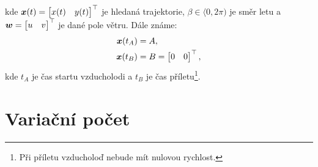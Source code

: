 \documentclass[reqno, a4paper]{amsart}
\numberwithin{equation}{section}
\begin{document}
kde $
\bm{x}(t)=
  \begin{bmatrix}
    x(t) &
    y(t)
  \end{bmatrix}
^\top
$ je hledaná trajektorie, $\beta \in \langle 0, 2 \pi)$ je směr letu a $
\vec{w}
=
\transpose{
  \begin{bmatrix}
    u &
    v
  \end{bmatrix}
}
$ je dané pole větru. Dále známe:
\begin{subequations}
  \label{eq:1}
  \begin{align}
    \label{eq:2}
    \bm{x}(t_{A})& = A, \\
    \label{eq:3}
    \bm{x}(t_{B})& = B = 
  \begin{bmatrix}
    0 &
    0
  \end{bmatrix}
^\top,
  \end{align}
\end{subequations}
kde $t_{A}$ je čas startu vzducholodi a $t_{B}$ je čas příletu\footnote{Při příletu vzducholoď nebude mít nulovou rychlost.}. 

\section{Variační počet}
\label{sec:Variační počet}
\end{document}
